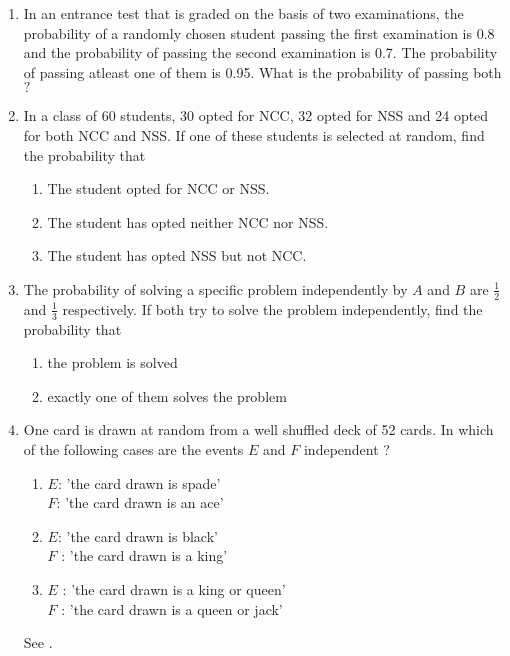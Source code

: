 \begin{enumerate}[label=\thesubsection.\arabic*,ref=\thesubsection.\theenumi]
	\solution

\item In an entrance test that is graded on the basis of two examinations, the probability of a randomly chosen student passing the first examination is 0.8 and the probability of passing the second examination is 0.7. The probability of passing atleast one of them is 0.95. What is the probability of passing both$?$
	\\
	\solution

 \item In a class of 60 students, 30 opted for NCC, 32 opted for NSS and 24 
    opted for both NCC and NSS. If one of these students is selected at random, 
    find the probability that
    \begin{enumerate}
        \item The student opted for NCC or NSS.
        \item The student has opted neither NCC nor NSS.
        \item The student has opted NSS but not NCC.
    \end{enumerate}
	\solution

\item The probability of solving a specific problem independently by $A$ and $B$ are $\frac{1}{2}$ and $\frac{1}{3}$ respectively. If both try to solve the problem independently, find the probability that
		\label{ncert/12/13/2/13}
\begin{enumerate}
\item the problem is solved
\item exactly one of them solves the problem
\end{enumerate}
\solution

\item One card is drawn at random from a well shuffled deck of 52 cards. In which of the following cases are the events $E$ and $F$ independent ?
		\label{ncert/12/13/2/14}
\begin{enumerate}
\item $E$: 'the card drawn is spade'\\
$F$: 'the card drawn is an ace'
\item $E$: 'the card drawn is black’\\
$F$ : 'the card drawn is a king’
\item $E$ : 'the card drawn is a king or queen’\\
$F$ : 'the card drawn is a queen or jack’
\end{enumerate}
\solution
See .
\begin{table}[htb]\centering

\end{table}
\end{enumerate}
